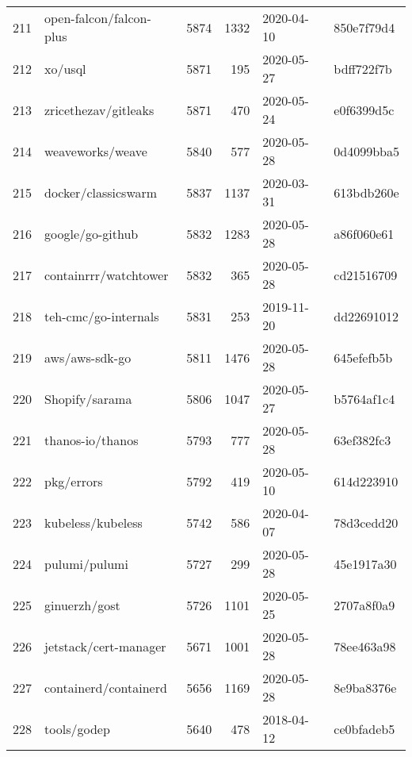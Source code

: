 \begin{longtable}{llrrll}
    211 &                            open-falcon/falcon-plus &   5874 &   1332 & 2020-04-10 &  850e7f79d4 \\
    212 &                                            xo/usql &   5871 &    195 & 2020-05-27 &  bdff722f7b \\
    213 &                               zricethezav/gitleaks &   5871 &    470 & 2020-05-24 &  e0f6399d5c \\
    214 &                                   weaveworks/weave &   5840 &    577 & 2020-05-28 &  0d4099bba5 \\
    215 &                                docker/classicswarm &   5837 &   1137 & 2020-03-31 &  613bdb260e \\
    216 &                                   google/go-github &   5832 &   1283 & 2020-05-28 &  a86f060e61 \\
    217 &                              containrrr/watchtower &   5832 &    365 & 2020-05-28 &  cd21516709 \\
    218 &                               teh-cmc/go-internals &   5831 &    253 & 2019-11-20 &  dd22691012 \\
    219 &                                     aws/aws-sdk-go &   5811 &   1476 & 2020-05-28 &  645efefb5b \\
    220 &                                     Shopify/sarama &   5806 &   1047 & 2020-05-27 &  b5764af1c4 \\
    221 &                                   thanos-io/thanos &   5793 &    777 & 2020-05-28 &  63ef382fc3 \\
    222 &                                         pkg/errors &   5792 &    419 & 2020-05-10 &  614d223910 \\
    223 &                                  kubeless/kubeless &   5742 &    586 & 2020-04-07 &  78d3cedd20 \\
    224 &                                      pulumi/pulumi &   5727 &    299 & 2020-05-28 &  45e1917a30 \\
    225 &                                      ginuerzh/gost &   5726 &   1101 & 2020-05-25 &  2707a8f0a9 \\
    226 &                              jetstack/cert-manager &   5671 &   1001 & 2020-05-28 &  78ee463a98 \\
    227 &                              containerd/containerd &   5656 &   1169 & 2020-05-28 &  8e9ba8376e \\
    228 &                                        tools/godep &   5640 &    478 & 2018-04-12 &  ce0bfadeb5 \\

\end{longtable}
